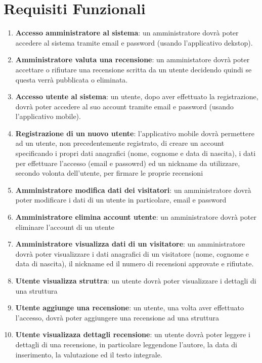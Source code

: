 \section{Requisiti Funzionali}
\begin{enumerate}
    \item  \textbf{Accesso amministratore al sistema}: un amministratore dovrà poter accedere al sistema tramite email e password (usando l'applicativo dekstop).
    \item  \textbf{Amministratore valuta una recensione}: un amministatore dovrà poter accettare o rifiutare una recensione scritta da un utente decidendo quindi se questa verrà pubblicata o eliminata.
    \item \textbf{Accesso utente al sistema}: un utente, dopo aver effettuato la registrazione, dovrà poter accedere al suo account tramite email e password (usando l'applicativo mobile). 
    \item  \textbf{Registrazione di un nuovo utente}: l'applicativo mobile dovrà permettere ad un utente, non precedentemente registrato, di creare un account specificando 
    i propri dati anagrafici (nome, cognome e data di nascita), i dati per effettuare l'accesso (email e passowrd) ed un nickname da utilizzare, secondo volonta dell'utente, per firmare  
    le proprie recensioni
    \item \textbf{Amministratore modifica dati dei visitatori}: un amministratore dovrà poter modificare i dati di un utente in particolare, email e password
    \item \textbf{Amministratore elimina account utente}: un amministratore dovrà poter eliminare l'account di un utente
    \item \textbf{Amministratore visualizza dati di un visitatore}: un amministratore dovrà poter visualizzare i dati anagrafici di un visitatore (nome, cognome e data di nascita), 
    il nickname ed il numero di recensioni approvate e rifiutate.
    \item \textbf{Utente visualizza struttra}: un utente dovrà poter visualizzare i dettagli di una struttura
    \item \textbf{Utente aggiunge una recensione}: un utente, una volta aver effettuato l'accesso, dovrà poter aggiungere una recensione ad una struttura
    \item \textbf{Utente visualizaza dettagli recensione}: un utente dovrà poter leggere i dettagli di una recensione, in particolare leggendone l'autore, la data di inserimento, la valutazione
    ed il testo integrale.
\end{enumerate}

